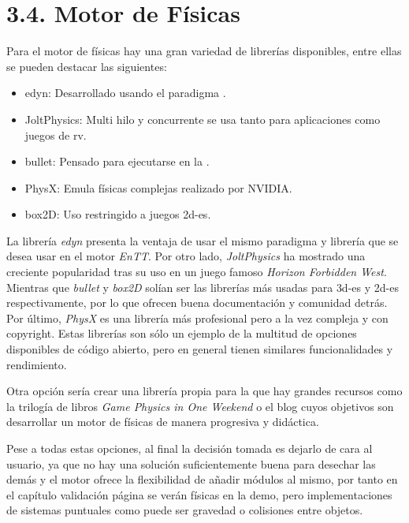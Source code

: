 \section*{3.4. Motor de Físicas}\label{sec:physics_engine}

Para el motor de físicas hay una gran variedad de librerías disponibles, entre ellas se pueden destacar las siguientes:
\begin{itemize}
    \item edyn\cite{edyn}: Desarrollado usando el paradigma .
    \item JoltPhysics\cite{JoltPhysics}: Multi hilo y concurrente se usa tanto para aplicaciones como juegos de \gls{rv}.
    \item bullet\cite{bullet}: Pensado para ejecutarse en la .
    \item PhysX\cite{PhysX}: Emula físicas complejas realizado por NVIDIA\cite{NVIDIA}.
    \item box2D\cite{Box2D}: Uso restringido a juegos \gls{2d-es}.
\end{itemize}
La librería \textit{edyn} presenta la ventaja de usar el mismo paradigma y librería que se desea usar en el motor \textit{EnTT}\cite{entt}.
Por otro lado, \textit{JoltPhysics} ha mostrado una creciente popularidad tras su uso en un juego famoso \textit{Horizon Forbidden West}\cite{horizon}. Mientras
que \textit{bullet} y \textit{box2D} solían ser las librerías más usadas para \gls{3d-es} y \gls{2d-es} respectivamente, por lo que ofrecen buena documentación
y comunidad detrás. Por último, \textit{PhysX} es una librería más profesional pero a la vez compleja y con copyright. Estas librerías
son sólo un ejemplo de la multitud de opciones disponibles de código abierto, pero en general tienen similares funcionalidades
y rendimiento.

Otra opción sería crear una librería propia para la que hay grandes recursos como la trilogía de libros
\textit{Game Physics in One Weekend}\cite{game-physics-in-one-weekend} o el blog\cite{designing-physics-engine}
cuyos objetivos son desarrollar un motor de físicas de manera progresiva y didáctica.

Pese a todas estas opciones, al final la decisión tomada es dejarlo de cara al usuario, ya que no hay una solución suficientemente buena
para desechar las demás y el motor ofrece la flexibilidad de añadir módulos al mismo, por tanto en el capítulo validación página \pageref{cap:validation} se verán físicas en la demo, pero implementaciones de sistemas
puntuales como puede ser gravedad o colisiones entre objetos.

